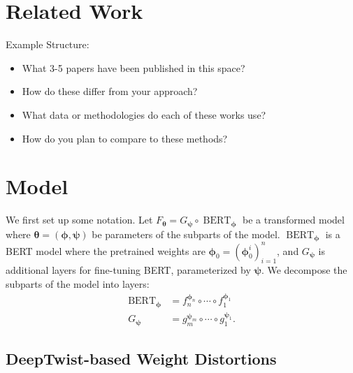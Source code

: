 \documentclass{article}
\newcommand{\bert}{\operatorname{BERT}}
\newcommand{\btheta}{{\bm{\theta}}}
\newcommand{\bphi}{{\bm{\phi}}}
\newcommand{\bpsi}{{\bm{\psi}}}
\begin{document}

\section{Related Work}

Example Structure:
\begin{itemize}
\item What 3-5 papers have been published in this space?
\item How do these  differ from your approach?
\item What data or methodologies do each of these works use?
\item How do you plan to compare to these methods?
\end{itemize}




\section{Model}

We first set up some notation. Let $F_\btheta = G_\bpsi \circ \bert_\bphi$ be a
transformed model where
$\btheta = (\bphi, \bpsi)$ be parameters of the subparts of the model.
$\bert_\bphi$ is a BERT model where the pretrained weights are $\bphi_0 = 
(\bphi_0^i)_{i=1}^n$, and
$G_\bpsi$ is additional layers for fine-tuning BERT, parameterized by $\bpsi$.
We decompose the subparts of the model into layers: \begin{align*}
\bert_\bphi &= f_{n}^{\bphi_n} \circ \cdots \circ f_1^{\bphi_1} \\
G_\bpsi &= g_{m}^{\bpsi_m} \circ \cdots \circ g_1^{\bpsi_1}.
\end{align*}

\subsection{DeepTwist-based Weight Distortions}
\end{document}
